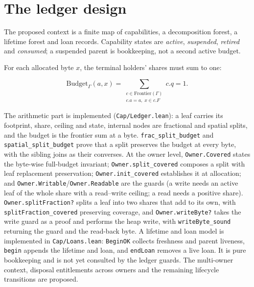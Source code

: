 \documentclass[10pt,a4paper]{article}
\newcommand{\file}[1]{\texttt{\small #1}}
\begin{document}
\section{The ledger design}\label{sec:ledger}

The proposed context is a finite map of capabilities, a decomposition forest, a
lifetime forest and loan records. Capability states are \emph{active},
\emph{suspended}, \emph{retired} and \emph{consumed}; a suspended parent is
bookkeeping, not a second active budget.

For each allocated byte $x$, the terminal holders' shares must sum to one:

\[
\mathrm{Budget}_{\Gamma}(a,x)
=
\sum_{\substack{c \in \mathrm{Frontier}(\Gamma)\\ c.a = a,\; x \in c.F}} c.q
= 1.
\]

The arithmetic part is implemented (\file{Cap/Ledger.lean}): a leaf carries its
footprint, share, ceiling and state, internal nodes are fractional and spatial
splits, and the budget is the frontier sum at a byte. \texttt{frac\_split\_budget}
and \texttt{spatial\_split\_budget} prove that a split preserves the budget at
every byte, with the sibling joins as their converses. At the owner level, \texttt{Owner.Covered} states the byte-wise full-budget
invariant; \texttt{Owner.split\_covered} composes a split with leaf replacement
preservation; \texttt{Owner.init\_covered} establishes it at allocation; and
\texttt{Owner.Writable}/\texttt{Owner.Readable} are the guards (a write needs an active leaf of
the whole share with a read--write ceiling; a read needs a positive share). \texttt{Owner.splitFraction?} splits a leaf into two shares that add to
its own, with \texttt{splitFraction\_covered} preserving coverage, and \texttt{Owner.writeByte?}
takes the write guard as a proof and performs the heap write, with
\texttt{writeByte\_sound} returning the guard and the read-back byte. A lifetime and loan
model is implemented in \file{Cap/Loans.lean}: \texttt{BeginOK} collects freshness and
parent liveness, \texttt{begin} appends the lifetime and loan, and \texttt{endLoan} removes a
live loan. It is pure bookkeeping and is not yet consulted by the ledger guards.
The multi-owner context, disposal entitlements across owners and the remaining
lifecycle transitions are proposed.
\end{document}
